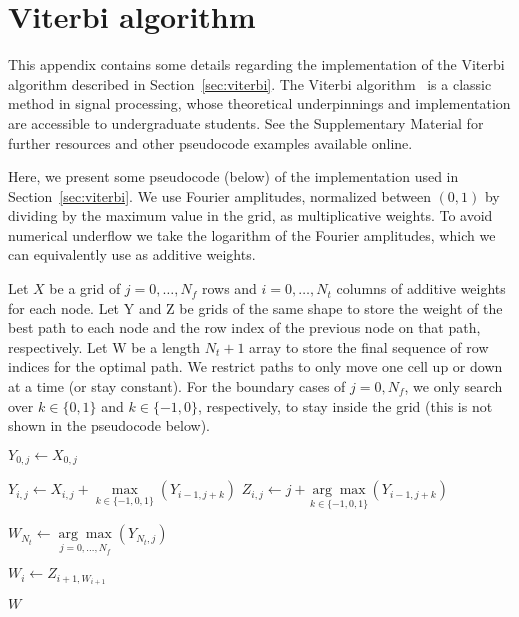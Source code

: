 \documentclass[paper-main.tex]{subfiles}
\begin{document}
\section{Viterbi algorithm}
\label{app:viterbi}

This appendix contains some details regarding the implementation of the Viterbi algorithm described in Section~\ref{sec:viterbi}. 
The Viterbi algorithm~\cite{Viterbi:1967} is a classic method in signal processing, whose theoretical underpinnings and implementation are accessible to undergraduate students. 
See the Supplementary Material for further resources and other pseudocode examples available online.


Here, we present some pseudocode (below) of the implementation used in Section~\ref{sec:viterbi}. We use Fourier amplitudes, normalized between $(0, 1)$ by dividing by the maximum value in the grid, as multiplicative weights. 
To avoid numerical underflow we take the logarithm of the Fourier amplitudes, which we can equivalently use as additive weights.


Let $X$ be a grid of $j=0,\ldots,N_f$ rows and $i=0,\ldots,N_t$ columns of additive weights for each node. Let Y and Z be grids of the same shape to store the weight of the best path to each node and the row index of the previous node on that path, respectively. Let W be a length $N_t+1$ array to store the final sequence of row indices for the optimal path. We restrict paths to only move one cell up or down at a time (or stay constant). For the boundary cases of $j=0,N_f$, we only search over $k \in \{0,1\}$ and $k \in \{-1,0\}$, respectively, to stay inside the grid (this is not shown in the pseudocode below).

\begin{algorithmic}

		\State $Y_{0,j} \gets X_{0,j}$
    \EndFor

		
	    	\State $Y_{i,j} \gets X_{i,j} + \underset{k \in \{-1,0,1\}}{\max} (Y_{i-1,j+k})$
	    	\State $Z_{i,j} \gets j + \underset{k \in \{-1,0,1\}}{\arg\max} (Y_{i-1,j+k})$
   
	    \EndFor
    \EndFor

    \State $W_{N_t} \gets \underset{j=0,\ldots,N_f}{\arg\max} (Y_{N_t,j})$


		\State $W_i \gets Z_{i+1, W_{i+1}}$

    \EndFor    

    \State \Return $W$
\EndFunction
\end{algorithmic}
\end{document}
